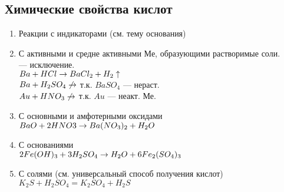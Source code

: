 \subsection{Химические свойства кислот}
\begin{enumerate}
    \item Реакции с индикаторами (см. тему основания)

    \item С активными и средне активными Ме, образующими растворимые соли.\\
         --- исключение.\\
        $Ba + HCl \rightarrow BaCl_2 + H_2\uparrow$\\
        $Ba + H_2SO_4 \not \rightarrow$ т.к. $BaSO_4$ --- нераст.\\
        $Au + HNO_3 \not \rightarrow$ т.к. $Au$ --- неакт. Ме.

    \item С основными и амфотерными оксидами\\
        $BaO + 2HNO3 \rightarrow Ba(NO_3)_2 + H_2O$

    \item С основаниями\\
        $2Fe(OH)_3 + 3H_2SO_4 \rightarrow H_2O + 6Fe_2(SO_4)_3$

    \item С солями (см. универсальный способ получения кислот)\\
        $K_2S + H_2SO_4 = K_2SO_4 + H_2S$

\end{enumerate}

